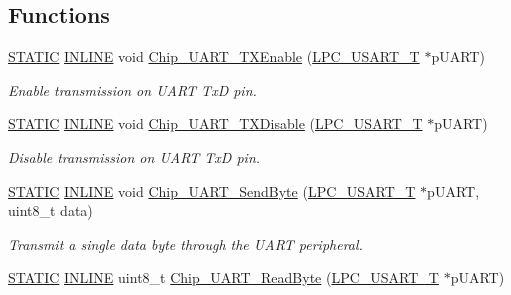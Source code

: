 \subsection*{Functions}
\begin{DoxyCompactItemize}
\item 
\hyperlink{group___l_p_c___types___public___macros_ga10b2d890d871e1489bb02b7e70d9bdfb}{S\+T\+A\+T\+IC} \hyperlink{spifi__18xx__43xx_8h_a2eb6f9e0395b47b8d5e3eeae4fe0c116}{I\+N\+L\+I\+NE} void \hyperlink{group___u_a_r_t__18_x_x__43_x_x_ga6220ec27deb21fff77fac8fe82890ad2}{Chip\+\_\+\+U\+A\+R\+T\+\_\+\+T\+X\+Enable} (\hyperlink{struct_l_p_c___u_s_a_r_t___t}{L\+P\+C\+\_\+\+U\+S\+A\+R\+T\+\_\+T} $\ast$p\+U\+A\+RT)
\begin{DoxyCompactList}\small\item\em Enable transmission on U\+A\+RT TxD pin. \end{DoxyCompactList}\item 
\hyperlink{group___l_p_c___types___public___macros_ga10b2d890d871e1489bb02b7e70d9bdfb}{S\+T\+A\+T\+IC} \hyperlink{spifi__18xx__43xx_8h_a2eb6f9e0395b47b8d5e3eeae4fe0c116}{I\+N\+L\+I\+NE} void \hyperlink{group___u_a_r_t__18_x_x__43_x_x_ga801600ca2aa7ab55f799178867c12b96}{Chip\+\_\+\+U\+A\+R\+T\+\_\+\+T\+X\+Disable} (\hyperlink{struct_l_p_c___u_s_a_r_t___t}{L\+P\+C\+\_\+\+U\+S\+A\+R\+T\+\_\+T} $\ast$p\+U\+A\+RT)
\begin{DoxyCompactList}\small\item\em Disable transmission on U\+A\+RT TxD pin. \end{DoxyCompactList}\item 
\hyperlink{group___l_p_c___types___public___macros_ga10b2d890d871e1489bb02b7e70d9bdfb}{S\+T\+A\+T\+IC} \hyperlink{spifi__18xx__43xx_8h_a2eb6f9e0395b47b8d5e3eeae4fe0c116}{I\+N\+L\+I\+NE} void \hyperlink{group___u_a_r_t__18_x_x__43_x_x_gaa600b8621d1425b1b493238a68f38088}{Chip\+\_\+\+U\+A\+R\+T\+\_\+\+Send\+Byte} (\hyperlink{struct_l_p_c___u_s_a_r_t___t}{L\+P\+C\+\_\+\+U\+S\+A\+R\+T\+\_\+T} $\ast$p\+U\+A\+RT, uint8\+\_\+t data)
\begin{DoxyCompactList}\small\item\em Transmit a single data byte through the U\+A\+RT peripheral. \end{DoxyCompactList}\item 
\hyperlink{group___l_p_c___types___public___macros_ga10b2d890d871e1489bb02b7e70d9bdfb}{S\+T\+A\+T\+IC} \hyperlink{spifi__18xx__43xx_8h_a2eb6f9e0395b47b8d5e3eeae4fe0c116}{I\+N\+L\+I\+NE} uint8\+\_\+t \hyperlink{group___u_a_r_t__18_x_x__43_x_x_ga8eec9067080637eea7ecfedac6586fe9}{Chip\+\_\+\+U\+A\+R\+T\+\_\+\+Read\+Byte} (\hyperlink{struct_l_p_c___u_s_a_r_t___t}{L\+P\+C\+\_\+\+U\+S\+A\+R\+T\+\_\+T} $\ast$p\+U\+A\+RT)

\end{DoxyCompactItemize}
